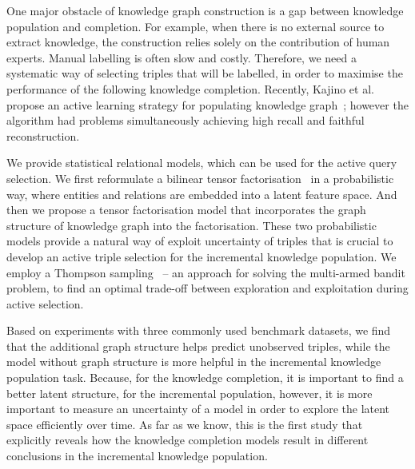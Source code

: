 One major obstacle of knowledge graph construction is a gap between knowledge 
population and completion. For example, when there is no external source to extract knowledge,
the construction relies solely on the contribution of human experts.
Manual labelling is often slow and costly. 
Therefore, we need a systematic way of selecting triples that will be labelled, in order to maximise the performance of the following knowledge completion.
Recently, Kajino et al. propose an active learning strategy for populating knowledge graph~\cite{kajino2015active}; 
however the algorithm had problems simultaneously achieving high recall and faithful reconstruction.

We provide statistical relational models, which can be used for the active query selection. %
We first reformulate a bilinear tensor factorisation~\cite{nickel2015review} in a probabilistic way, where entities and relations are embedded into a latent feature space. And then we propose a tensor factorisation model that incorporates the graph structure of knowledge graph into the factorisation. These two probabilistic models provide a natural way of exploit uncertainty of triples that is crucial to develop 
an active triple selection for the incremental knowledge population.
We employ a Thompson sampling~\cite{scott10bandit} -- an approach for solving the multi-armed bandit problem,
to find an optimal trade-off between exploration and exploitation during active selection.

Based on experiments with three commonly used benchmark datasets, we find that the additional graph structure helps predict unobserved triples, while the model without graph structure is more helpful in the incremental knowledge population task.
Because, for the knowledge completion, it is important to find a better latent structure, for the incremental population, however, it is more important to measure an uncertainty of a model in order to explore the latent space efficiently over time.
As far as we know, this is the first study that explicitly reveals how the knowledge completion models result in different conclusions in the incremental knowledge population.

